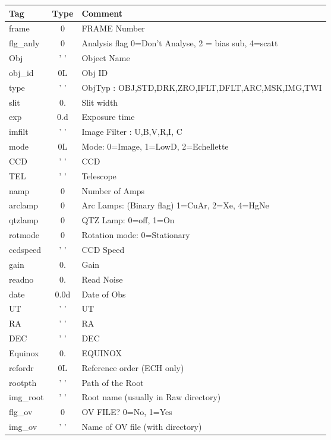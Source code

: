 \documentclass[11pt,letterpaper,dvips]{article}
\begin{document}
\begin{enumerate}
\begin{enumerate}
	{\small
	\begin{tabular}{lcl}
	  \hline
	  Tag & Type & Comment \\
	  \hline
         frame & 0     & FRAME Number \\
         flg\_anly & 0   &  Analysis flag 0=Don't Analyse, 2 = bias sub, 4=scatt \\
         Obj & ' '       & Object Name \\
         obj\_id & 0L     & Obj ID \\
         type & ' '    & ObjTyp : OBJ,STD,DRK,ZRO,IFLT,DFLT,ARC,MSK,IMG,TWI \\
         slit & 0.    & Slit width \\
         exp & 0.d        & Exposure time \\
         imfilt & ' '     & Image Filter : U,B,V,R,I, C \\
         mode & 0L     & Mode:  0=Image, 1=LowD, 2=Echellette \\
         CCD & ' '     & CCD \\
         TEL & ' '    & Telescope \\
         namp & 0     & Number of Amps \\
         arclamp& 0 & Arc Lamps: (Binary flag)  1=CuAr, 2=Xe, 4=HgNe \\
         qtzlamp& 0 & QTZ Lamp: 0=off, 1=On \\
         rotmode& 0&  Rotation mode: 0=Stationary\\ 
         ccdspeed& ' ' &        CCD Speed \\
         gain & 0.     & Gain \\
         readno & 0.     & Read Noise \\
         date & 0.0d    & Date of Obs \\
         UT & ' '    & UT \\
         RA & ' '    & RA \\
         DEC & ' '    & DEC \\
         Equinox & 0.     & EQUINOX \\
         refordr& 0L &         Reference order (ECH only) \\
         rootpth & ' '    & Path of the Root \\
         img\_root & ' '   & Root name (usually in Raw directory) \\
         flg\_ov &  0     & OV FILE?  0=No, 1=Yes   \\
         img\_ov &  ' '   & Name of OV file (with directory) \\

\end{tabular}}
\end{enumerate}
\end{enumerate}
\end{document}
